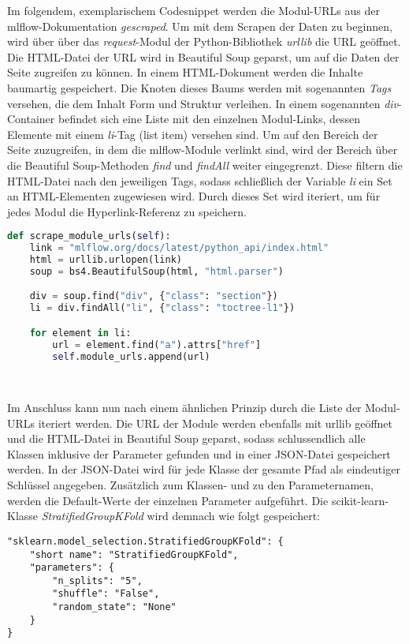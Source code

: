 \documentclass[german,bachelor]{swsLeipzig}
\begin{document}
Im folgendem, exemplarischem Codesnippet werden die Modul-URLs aus der mlflow-Dokumentation \textit{gescraped}.
Um mit dem Scrapen der Daten zu beginnen, wird über über das \textit{request}-Modul der Python-Bibliothek \textit{urllib} die URL geöffnet.
Die HTML-Datei der URL wird in Beautiful Soup geparst, um auf die Daten der Seite zugreifen zu können.
In einem HTML-Dokument werden die Inhalte baumartig gespeichert.
Die Knoten dieses Baums werden mit sogenannten \textit{Tags} versehen, die dem Inhalt Form und Struktur verleihen.
In einem sogenannten \textit{div}-Container befindet sich eine Liste mit den einzelnen Modul-Links, dessen Elemente mit
einem \textit{li}-Tag (list item) versehen sind.
Um auf den Bereich der Seite zuzugreifen, in dem die mlflow-Module verlinkt sind, wird der Bereich über die Beautiful Soup-Methoden
\textit{find} und \textit{findAll} weiter eingegrenzt.
Diese filtern die HTML-Datei nach den jeweiligen Tags, sodass schließlich der Variable \textit{li} ein Set an HTML-Elementen
zugewiesen wird.
Durch dieses Set wird iteriert, um für jedes Modul die Hyperlink-Referenz zu speichern.\\

\begin{lstlisting}[language=Python, frame=single, basicstyle=\small]
def scrape_module_urls(self):
    link = "mlflow.org/docs/latest/python_api/index.html"
    html = urllib.urlopen(link)
    soup = bs4.BeautifulSoup(html, "html.parser")

    div = soup.find("div", {"class": "section"})
    li = div.findAll("li", {"class": "toctree-l1"})

    for element in li:
        url = element.find("a").attrs["href"]
        self.module_urls.append(url)
\end{lstlisting}
\

Im Anschluss kann nun nach einem ähnlichen Prinzip durch die Liste der Modul-URLs iteriert werden.
Die URL der Module werden ebenfalls mit urllib geöffnet und die HTML-Datei in Beautiful Soup geparst, sodass
schlussendlich alle Klassen inklusive der Parameter gefunden und in einer JSON-Datei gespeichert werden.
In der JSON-Datei wird für jede Klasse der gesamte Pfad als eindeutiger Schlüssel angegeben.
Zusätzlich zum Klassen- und zu den Parameternamen, werden die Default-Werte der einzelnen Parameter aufgeführt.
Die scikit-learn-Klasse \textit{StratifiedGroupKFold} wird demnach wie folgt gespeichert:\\

\begin{lstlisting}[frame=single, basicstyle=\small]
"sklearn.model_selection.StratifiedGroupKFold": {
    "short name": "StratifiedGroupKFold",
    "parameters": {
        "n_splits": "5",
        "shuffle": "False",
        "random_state": "None"
    }
}
\end{lstlisting}
\
\end{document}
